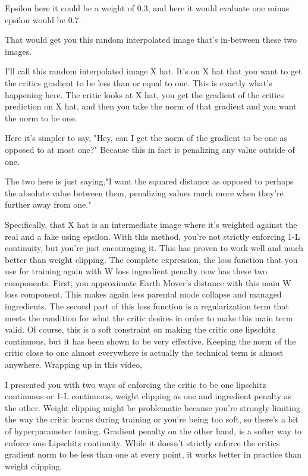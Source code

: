 \documentclass[11pt, onecolumn]{article}
\begin{document}
Epsilon here it could be a weight of 0.3, and here it would evaluate one minus epsilon would be 0.7.

That would get you this random interpolated image that's in-between these two images.

I'll call this random interpolated image X hat.
It's on X hat that you want to get the critics gradient to be less than or equal to one.
This is exactly what's happening here.
The critic looks at X hat, you get the gradient of the critics prediction on X hat, and then you take the norm of
that gradient and you want the norm to be one.

Here it's simpler to say, "Hey, can I get the norm of the gradient to be one as opposed to at most one?"
Because this in fact is penalizing any value outside of one.

The two here is just saying,"I want the squared distance as opposed to perhaps the absolute value between them,
penalizing values much more when they're further away from one."

Specifically, that X hat is an intermediate image where it's weighted against the real and a fake using epsilon.
With this method, you're not strictly
enforcing 1-L continuity,
but you're just encouraging it.
This has proven to work
well and much better than weight clipping.
The complete expression, the loss
function that you use for training again with
W loss ingredient penalty now has these two components.
First, you approximate Earth Mover's distance
with this main W loss component.
This makes again less parental
mode collapse and managed ingredients.
The second part of this loss function is
a regularization term that meets the condition
for what the critic desires in
order to make this main term valid.
Of course, this is a soft constraint on
making the critic one lipschitz continuous,
but it has been shown to be very effective.
Keeping the norm of the critic close to one
almost everywhere is actually
the technical term is almost anywhere.
Wrapping up in this video,

I presented you with two ways of enforcing the critic to be one lipschitz continuous or 1-L continuous,
weight clipping as one and ingredient penalty as the other.
Weight clipping might be problematic
because you're strongly limiting
the way the critic learns during
training or you're being too soft,
so there's a bit of hyperparameter tuning.
Gradient penalty on the other hand,
is a softer way to enforce one Lipschitz continuity.
While it doesn't strictly enforce
the critics gradient norm to
be less than one at every point,
it works better in practice than weight clipping. 
\end{document}
